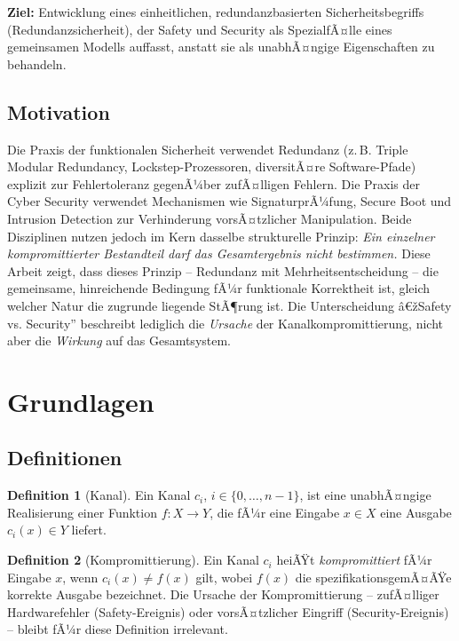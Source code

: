 ﻿\documentclass[a4paper,12pt]{article}
\theoremstyle{definition}
\newtheorem{definition}{Definition}
\begin{document}
\textbf{Ziel:} Entwicklung eines einheitlichen, redundanzbasierten Sicherheitsbegriffs (Redundanzsicherheit), der Safety und Security als SpezialfÃ¤lle eines gemeinsamen Modells auffasst, anstatt sie als unabhÃ¤ngige Eigenschaften zu behandeln.

\subsection{Motivation}

Die Praxis der funktionalen Sicherheit verwendet Redundanz (z.\,B. Triple Modular Redundancy, Lockstep-Prozessoren, diversitÃ¤re Software-Pfade) explizit zur Fehlertoleranz gegenÃ¼ber zufÃ¤lligen Fehlern. Die Praxis der Cyber Security verwendet Mechanismen wie SignaturprÃ¼fung, Secure Boot und Intrusion Detection zur Verhinderung vorsÃ¤tzlicher Manipulation. Beide Disziplinen nutzen jedoch im Kern dasselbe strukturelle Prinzip: \emph{Ein einzelner kompromittierter Bestandteil darf das Gesamtergebnis nicht bestimmen.} Diese Arbeit zeigt, dass dieses Prinzip -- Redundanz mit Mehrheitsentscheidung -- die gemeinsame, hinreichende Bedingung fÃ¼r funktionale Korrektheit ist, gleich welcher Natur die zugrunde liegende StÃ¶rung ist. Die Unterscheidung â€žSafety vs. Security'' beschreibt lediglich die \emph{Ursache} der Kanalkompromittierung, nicht aber die \emph{Wirkung} auf das Gesamtsystem.

\section{Grundlagen}

\subsection{Definitionen}

\begin{definition}[Kanal]
	Ein Kanal $c_i$, $i \in \{0,\ldots,n-1\}$, ist eine unabhÃ¤ngige Realisierung einer Funktion $f: X \to Y$, die fÃ¼r eine Eingabe $x \in X$ eine Ausgabe $c_i(x) \in Y$ liefert.
\end{definition}

\begin{definition}[Kompromittierung]
	Ein Kanal $c_i$ heiÃŸt \emph{kompromittiert} fÃ¼r Eingabe $x$, wenn $c_i(x) \neq f(x)$ gilt, wobei $f(x)$ die spezifikationsgemÃ¤ÃŸe korrekte Ausgabe bezeichnet. Die Ursache der Kompromittierung -- zufÃ¤lliger Hardwarefehler (Safety-Ereignis) oder vorsÃ¤tzlicher Eingriff (Security-Ereignis) -- bleibt fÃ¼r diese Definition irrelevant.
\end{definition}
\end{document}
